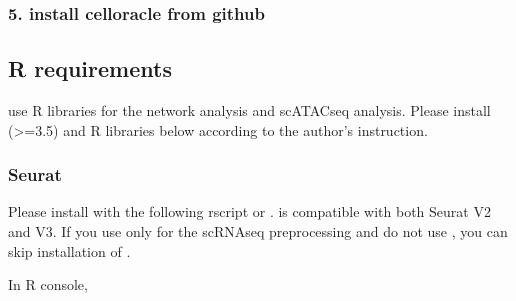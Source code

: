 \documentclass[letterpaper,10pt,english]{sphinxmanual}
\begin{document}
\begin{sphinxVerbatim}[commandchars=\\\{\}]
      
\end{sphinxVerbatim}


\subsubsection{5. install celloracle from github}
\label{\detokenize{installation/index:install-celloracle-from-github}}
\begin{sphinxVerbatim}[commandchars=\\\{\}]
  
\end{sphinxVerbatim}


\subsection{R requirements}
\label{\detokenize{installation/index:r-requirements}}
 use R libraries for the network analysis and scATAC\sphinxhyphen{}seq analysis.
Please install  (\textgreater{}=3.5) and R libraries below according to the author’s instruction.


\subsubsection{Seurat}
\label{\detokenize{installation/index:id2}}
Please install  with the following r\sphinxhyphen{}script or  .
 is compatible with both Seurat V2 and V3.
If you use only  for the scRNA\sphinxhyphen{}seq preprocessing and do not use  , you can skip installation of .

In R console,

\begin{sphinxVerbatim}[commandchars=\\\{\}]
\end{sphinxVerbatim}
\end{document}
